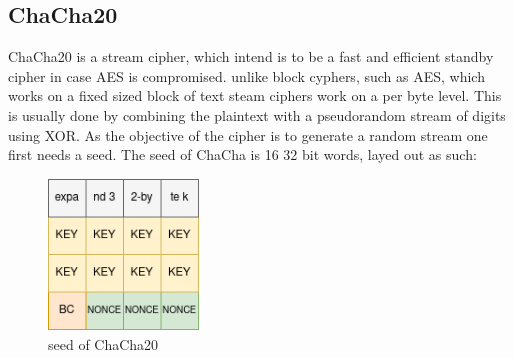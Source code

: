 \documentclass[a4paper]{article}
\begin{document}
\subsection{ChaCha20}
\label{ChaChaalg}
ChaCha20 is a stream cipher, which intend is to be a fast and efficient standby cipher in case AES is compromised. unlike block cyphers, such as AES, which works on a fixed sized block of text steam ciphers work on a per byte level. This is usually done by combining the plaintext with a pseudorandom stream of digits using XOR. As the objective of the cipher is to generate a random stream one first needs a seed. The seed of ChaCha is 16 32 bit words, layed out as such:
\begin{figure}[htbp]
\centering
\includegraphics[width=4cm]{./Background/ChaChaSeed.png}
\caption{\label{fig:ChaChaSeed}seed of ChaCha20}
\end{figure}
\end{document}
